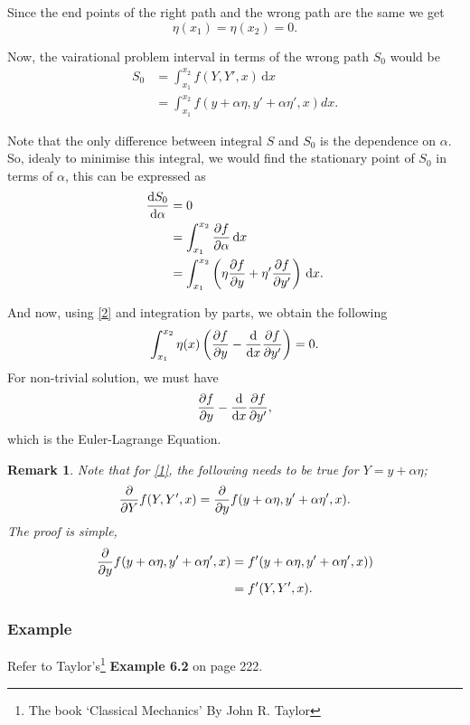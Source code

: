 \documentclass[a4paper]{article}
\newcommand{\dmr}[1]{\, \mathrm{d}#1} %
\newcommand{\intt}[2]{\int_{#1}^{#2}} %
\newtheorem{remark}{Remark}[subsubsection]
\numberwithin{equation}{subsection}
\begin{document}
Since the end points of the right path and the wrong path are the same we get
\begin{equation}
    \eta(x_1) = \eta(x_2) = 0.\label{2}    
\end{equation}

Now, the vairational problem interval in terms of the wrong path $S_0$ would be
\begin{align}
    S_0 &= \intt{x_1}{x_2} f(Y,Y',x) \dmr{x} \nonumber \\
    &= \intt{x_1}{x_2} f(y+\alpha \eta, y' + \alpha \eta', x)dx.
\end{align}

Note that the only difference between integral $S$ and $S_0$ is the dependence on $\alpha$. So, idealy to minimise this integral, we would find the stationary point of $S_0$ in terms of $\alpha$, this can be expressed as 
\begin{align}
    \dv{S_0}{\alpha} &= 0 \nonumber \\
    &= \intt{x_1}{x_2} \pdv{f}{\alpha} \dmr{x} \nonumber \\
    &= \intt{x_1}{x_2} \left(\eta \pdv{f}{y} + \eta' \pdv{f}{y'} \right) \dmr{x}.\label{1}
\end{align}

And now, using \eqref{2} and integration by parts, we obtain the following
\begin{equation}
    \intt{x_1}{x_2}\eta(x)\left(\pdv{f}{y}-\dv{x}\pdv{f}{y'}\right) = 0.
\end{equation}
For non-trivial solution, we must have 
\[
    \pdv{f}{y}-\dv{x}\pdv{f}{y'},
\]
which is the Euler-Lagrange Equation.

\begin{remark}
    Note that for \eqref{1}, the following needs to be true for $Y = y + \alpha \eta$;
    \[
        \pdv{}{Y} f(Y,Y',x) = \pdv{}{y} f(y+\alpha \eta, y'+\alpha \eta', x).
    \]
    The proof is simple,
    \begin{align*}
        \pdv{}{y} f(y+\alpha \eta, y'+\alpha \eta', x) &= f'(y+\alpha \eta, y'+\alpha \eta', x)) \\
        &= f'(Y, Y', x).
    \end{align*}
\end{remark}

\subsubsection{Example}
Refer to Taylor's\footnote{The book `Classical Mechanics'\cite{TaylorJohnR.JohnRobert2005Cm} By John R. Taylor} \textbf{Example 6.2} on page 222.
\end{document}
